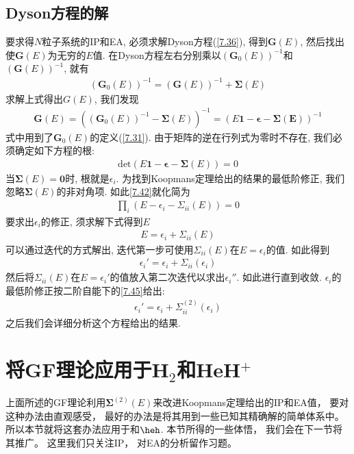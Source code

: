 \subsection{Dyson方程的解}
要求得$N$粒子系统的IP和EA, 
必须求解Dyson方程(\autoref{7.36}), 
得到$\mathbf{G}(E)$, 
然后找出使$\mathbf{G}(E)$为无穷的$E$值. 
在Dyson方程左右分别乘以$(\mathbf{G}_0(E))^{-1}$和$(\mathbf{G}(E))^{-1}$, 
就有
\begin{align}
(\mathbf{G}_0(E))^{-1} = (\mathbf{G}(E))^{-1} + \bm{\Sigma}(E)
\end{align}
求解上式得出$G(E)$, 
我们发现
\begin{align}\label{7.41}
\mathbf{G}(E) = ((\mathbf{G}_0(E))^{-1} - \bm{\Sigma}(E))^{-1} = (E\mathbf{1} - \bm{\epsilon} - \bm{\Sigma(E)})^{-1}
\end{align}
式中用到了$\mathbf{G}_0(E)$的定义(\autoref{7.31}). 
由于矩阵的逆在行列式为零时不存在, 
我们必须确定如下方程的根:
\begin{align}\label{7.42}
\mathrm{det}(E\mathbf{1} - \bm{\epsilon} - \bm{\Sigma}(E)) = 0
\end{align}
当$\bm{\Sigma}(E)=\mathbf{0}$时, 
根就是$\epsilon_i$. 
为找到Koopmans定理给出的结果的最低阶修正, 
我们忽略$\bm{\Sigma}(E)$的非对角项. 
如此\autoref{7.42}就化简为
\begin{align}
\prod_i (E-\epsilon_i - \Sigma_{ii}(E)) = 0
\end{align}
要求出$\epsilon_i$的修正, 
须求解下式得到$E$
\begin{align}
E=\epsilon_i+\Sigma_{ii}(E)
\end{align}
可以通过迭代的方式解出, 
迭代第一步可使用$\Sigma_{ii}(E)$在$E=\epsilon_i$的值. 
如此得到
\begin{align}\label{7.45}
\epsilon_i' = \epsilon_i + \Sigma_{ii}(\epsilon_i)
\end{align}
然后将$\Sigma_{ii}(E)$在$E=\epsilon_i'$的值放入第二次迭代以求出$\epsilon_i''$. 
如此进行直到收敛. 
$\epsilon_i$的最低阶修正按二阶自能下的\autoref{7.45}给出:
\begin{align}\label{7.46}
\epsilon_i' = \epsilon_i + \Sigma_{ii}^{(2)}(\epsilon_i)
\end{align}
之后我们会详细分析这个方程给出的结果.

\section{将GF理论应用于H$_2$和HeH$^+$}
上面所述的GF理论利用$\bm{\Sigma}^{(2)}(E)$来改进Koopmans定理给出的IP和EA值，
要对这种办法由直观感受，
最好的办法是将其用到一些已知其精确解的简单体系中。
所以本节就将这套办法应用于和$\heh$. 
本节所得的一些体悟，
我们会在下一节将其推广。
这里我们只关注IP，
对EA的分析留作习题。


